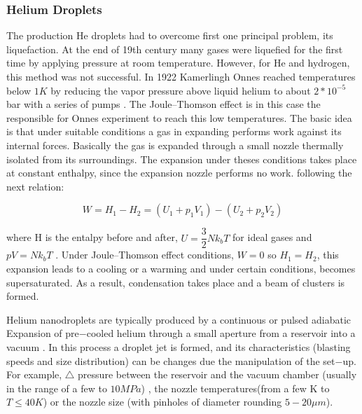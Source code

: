 \subsubsection{Helium Droplets}

The production He droplets had to overcome first one principal problem, its liquefaction. At the end  of 19th century many gases were liquefied for the first time by applying pressure at room temperature. However, for He and hydrogen, this method was not successful. In 1922 Kamerlingh Onnes reached temperatures below $1K$ by reducing the vapor pressure above liquid helium to about $2*10^{-5}$ bar with a series of pumps \cite{van_delft_discovery_2010}. The Joule–Thomson effect \cite{weinberger_discovery_2013} is in this case the responsible for Onnes experiment to reach this low temperatures. The basic idea is that under suitable conditions a gas in expanding performs work against its internal forces. Basically the gas is expanded through a small nozzle thermally isolated from its surroundings. The expansion under theses conditions takes place at constant enthalpy, since the expansion nozzle performs no work. following the next relation:

\begin{equation}
W= H_{1}-H_{2} = (U_{1}+p_{1}V_{1})-(U_{2}+p_{2}V_{2})
\end{equation}

where H is the entalpy before and after, $U=\dfrac{3}{2}Nk_{b}T$ for ideal gases and $pV=Nk_{b}T$ \cite{enss_low-temperature_2005}. Under Joule–Thomson effect conditions, $W=0$ so $H_{1}=H_{2}$, this expansion leads to a cooling or a warming and under certain conditions, becomes supersaturated. As a result, condensation takes place and a beam of clusters is formed.

Helium nanodroplets are typically produced by a continuous or pulsed adiabatic Expansion of pre$-$cooled helium through a small aperture from a reservoir into a vacuum  \cite{stienkemeier_spectroscopy_2006}. In this process a droplet jet is formed, and its characteristics (blasting speeds and size distribution) can be changes due the manipulation of the set$-$up. For example, $\bigtriangleup$ pressure between the reservoir and the vacuum chamber (usually in the range of a few to $10MPa$) , the nozzle temperatures(from a few K to $T \leqslant 40K$) or the nozzle size (with pinholes of diameter rounding  $5-20 \mu m$).



